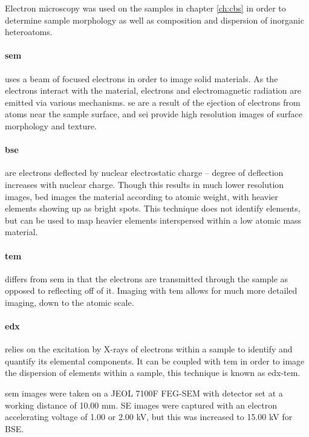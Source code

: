 Electron microscopy was used on the samples in chapter \ref{ch:cbs} in order to determine sample morphology as well as composition and dispersion of inorganic heteroatoms.

\paragraph{\acrfull{sem}} uses a beam of focused electrons in order to image solid materials. As the electrons interact with the material, electrons and electromagnetic radiation are emitted via various mechanisms. \Acrfull{se} are a result of the ejection of electrons from atoms near the sample surface, and \acrfull{sei} provide high resolution images of surface morphology and texture.\citep{Goldstein2017Scanning} 

\paragraph{\acrfull{bse}} are electrons deflected by nuclear electrostatic charge – degree of deflection increases with nuclear charge. Though this results in much lower resolution images, \acrfull{bed} images the material according to atomic weight, with heavier elements showing up as bright spots. This technique does not identify elements, but can be used to map heavier elements interspersed within a low atomic mass material.\citep{Goldstein2017Scanning}

\paragraph{\acrfull{tem}} differs from \acrshort{sem} in that the electrons are transmitted through the sample as opposed to reflecting off of it. Imaging with \acrshort{tem} allows for much more detailed imaging, down to the atomic scale.\citep{knoll1932elektronenmikroskop}

\paragraph{\acrfull{edx}} relies on the excitation by X-rays of electrons within a sample to identify and quantify its elemental components. It can be coupled with \acrshort{tem} in order to image the dispersion of elements within a sample, this technique is known as \acrshort{edx}-\acrshort{tem}.\citep{Goldstein2017Scanning}

\par \acrshort{sem} images were taken on a JEOL 7100F FEG-SEM with detector set at a working distance of 10.00 mm. SE images were captured with an electron accelerating voltage of 1.00 or 2.00 kV, but this was increased to 15.00 kV for BSE. %

